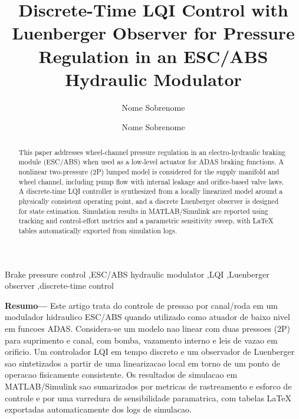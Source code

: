 \documentclass[a4paper]{ifacconf}
\begin{document}
\begin{frontmatter}

    \title{Discrete-Time LQI Control with Luenberger Observer for Pressure Regulation in an ESC/ABS Hydraulic Modulator}

    \author[First]{Nome Sobrenome}\author[Second]{Nome Sobrenome}
    \address[First]{Programa de Pos-Graduacao, Instituicao, Cidade, Pais (e-mail: autor@exemplo.com)}
    \address[Second]{Empresa/Instituicao, Cidade, Pais (e-mail: autor2@exemplo.com)}

    \begin{abstract}
        This paper addresses wheel-channel pressure regulation in an electro-hydraulic braking module (ESC/ABS) when used as a low-level actuator for ADAS braking functions. A nonlinear two-pressure (2P) lumped model is considered for the supply manifold and wheel channel, including pump flow with internal leakage and orifice-based valve laws. A discrete-time LQI controller is synthesized from a locally linearized model around a physically consistent operating point, and a discrete Luenberger observer is designed for state estimation. Simulation results in MATLAB/Simulink are reported using tracking and control-effort metrics and a parametric sensitivity sweep, with LaTeX tables automatically exported from simulation logs.
    \end{abstract}

    \begin{keyword}
        Brake pressure control \sep ESC/ABS hydraulic modulator \sep LQI \sep Luenberger observer \sep discrete-time control
    \end{keyword}

    \noindent\textbf{Resumo---}
    Este artigo trata do controle de pressao por canal/roda em um modulador hidraulico ESC/ABS quando utilizado como atuador de baixo nivel em funcoes ADAS. Considera-se um modelo nao linear com duas pressoes (2P) para suprimento e canal, com bomba, vazamento interno e leis de vazao em orificio. Um controlador LQI em tempo discreto e um observador de Luenberger sao sintetizados a partir de uma linearizacao local em torno de um ponto de operacao fisicamente consistente. Os resultados de simulacao em MATLAB/Simulink sao sumarizados por metricas de rastreamento e esforco de controle e por uma varredura de sensibilidade paramatrica, com tabelas LaTeX exportadas automaticamente dos logs de simulacao.

\end{frontmatter}
\end{document}
